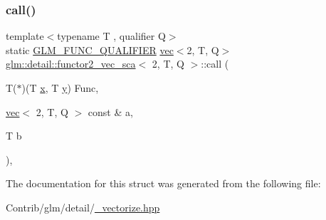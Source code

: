 \subsubsection{\texorpdfstring{call()}{call()}}
{\footnotesize\ttfamily template$<$typename T , qualifier Q$>$ \\
static \mbox{\hyperlink{setup_8hpp_a33fdea6f91c5f834105f7415e2a64407}{G\+L\+M\+\_\+\+F\+U\+N\+C\+\_\+\+Q\+U\+A\+L\+I\+F\+I\+ER}} \mbox{\hyperlink{structglm_1_1vec}{vec}}$<$2, T, Q$>$ \mbox{\hyperlink{structglm_1_1detail_1_1functor2__vec__sca}{glm\+::detail\+::functor2\+\_\+vec\+\_\+sca}}$<$ 2, T, Q $>$\+::call (\begin{DoxyParamCaption}\item[{T($\ast$)(T \mbox{\hyperlink{_s_d_l__opengl_8h_ad0e63d0edcdbd3d79554076bf309fd47}{x}}, T \mbox{\hyperlink{_s_d_l__opengl_8h_a1675d9d7bb68e1657ff028643b4037e3}{y}})}]{Func,  }\item[{\mbox{\hyperlink{structglm_1_1vec}{vec}}$<$ 2, T, Q $>$ const \&}]{a,  }\item[{T}]{b }\end{DoxyParamCaption})\hspace{0.3cm}{\ttfamily [inline]}, {\ttfamily [static]}}



The documentation for this struct was generated from the following file\+:\begin{DoxyCompactItemize}
\item 
Contrib/glm/detail/\mbox{\hyperlink{__vectorize_8hpp}{\+\_\+vectorize.\+hpp}}\end{DoxyCompactItemize}
